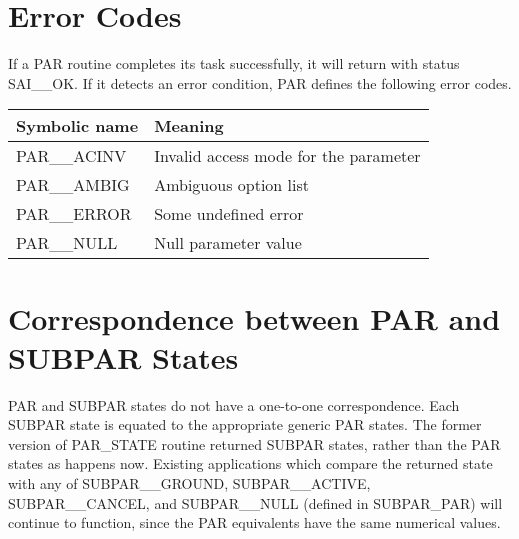 \documentclass[twoside,11pt,nolof]{starlink}
\begin{document}
\section{Error Codes}

If a PAR routine completes its task successfully, it will return with
status SAI\_\_OK.  If it detects an error condition, PAR defines the
following error codes.

\begin{center}
\begin{tabular}{|ll|}
\hline
Symbolic name & Meaning \\ \hline
PAR\_\_ACINV & Invalid access mode for the parameter \\
PAR\_\_AMBIG & Ambiguous option list \\
PAR\_\_ERROR & Some undefined error \\
PAR\_\_NULL & Null parameter value \\ \hline
\end{tabular}
\end{center}

\newpage
\section{Correspondence between PAR and SUBPAR States}

PAR and SUBPAR states do not have a one-to-one correspondence.  Each
SUBPAR state is equated to the appropriate generic PAR states.  The
former version of PAR\_STATE routine returned SUBPAR states, rather than
the PAR states as happens now.  Existing applications which compare the
returned state with any of SUBPAR\_\_GROUND, SUBPAR\_\_ACTIVE,
SUBPAR\_\_CANCEL, and SUBPAR\_\_NULL (defined in SUBPAR\_PAR) will
continue to function, since the PAR equivalents have the same numerical
values.
\end{document}
